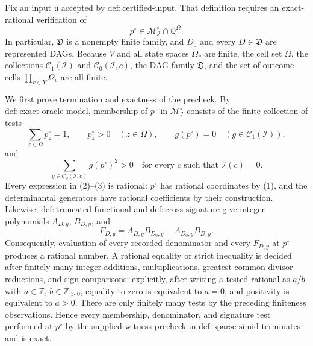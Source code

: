 Fix an input \(\mathfrak u\) accepted by \(\mathrm{def{:}certified\text{-}input}\).  That definition requires an exact-rational verification of
\[
 p^{\circ}\in\mathcal M_{\mathcal I}^{\circ}\cap\mathbb Q^{\Omega}. \tag{1}
\]
In particular, \(\mathfrak D\) is a nonempty finite family, and \(D_0\) and every \(D\in\mathfrak D\) are represented DAGs.  Because \(V\) and all state spaces \(\Omega_v\) are finite, the cell set \(\Omega\), the collections \(\mathcal C_1(\mathcal I)\) and \(\mathcal C_0(\mathcal I,c)\), the DAG family \(\mathfrak D\), and the set of outcome cells \(\prod_{v\in Y}\Omega_v\) are all finite.

We first prove termination and exactness of the precheck.  By \(\mathrm{def{:}exact\text{-}oracle\text{-}model}\), membership of \(p^{\circ}\) in \(\mathcal M_{\mathcal I}^{\circ}\) consists of the finite collection of tests
\[
 \sum_{z\in\Omega}p^{\circ}_z=1,\qquad
 p^{\circ}_z>0\quad(z\in\Omega),\qquad
 g(p^{\circ})=0\quad(g\in\mathcal C_1(\mathcal I)), \tag{2}
\]
and
\[
 \sum_{g\in\mathcal C_0(\mathcal I,c)}g(p^{\circ})^2>0
 \quad\text{for every \(c\) such that \(\mathcal I(c)=0\)}. \tag{3}
\]
Every expression in (2)--(3) is rational: \(p^{\circ}\) has rational coordinates by (1), and the determinantal generators have rational coefficients by their construction.  Likewise, \(\mathrm{def{:}truncated\text{-}functional}\) and \(\mathrm{def{:}cross\text{-}signature}\) give integer polynomials \(A_{D,y}\), \(B_{D,y}\), and
\[
 F_{D,y}=A_{D,y}B_{D_0,y}-A_{D_0,y}B_{D,y}. \tag{4}
\]
Consequently, evaluation of every recorded denominator and every \(F_{D,y}\) at \(p^{\circ}\) produces a rational number.  A rational equality or strict inequality is decided after finitely many integer additions, multiplications, greatest-common-divisor reductions, and sign comparisons: explicitly, after writing a tested rational as \(a/b\) with \(a\in\mathbb Z\), \(b\in\mathbb Z_{>0}\), equality to zero is equivalent to \(a=0\), and positivity is equivalent to \(a>0\).  There are only finitely many tests by the preceding finiteness observations.  Hence every membership, denominator, and signature test performed at \(p^{\circ}\) by the supplied-witness precheck in \(\mathrm{def{:}sparse\text{-}simid}\) terminates and is exact.

